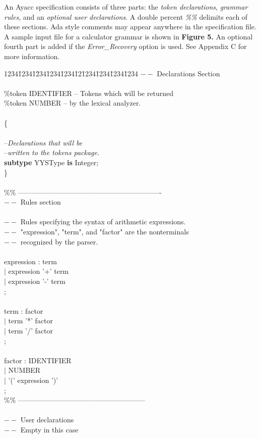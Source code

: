 An Ayacc specification  consists of three parts: the
{\it token declarations}, {\it grammar rules}, and an {\it optional user
declarations}.  A double percent
{\it \%\%}
delimits
each of these sections.  Ada style comments may appear
anywhere in the specification file.  A sample input
file for a calculator grammar is shown in {\bf Figure 5.}
An optional fourth part is added if the {\it Error\_Recovery} option
is used.  See Appendix C for more information.
\newpage
\noindent\hspace{-0.05in}\hrulefill\hspace{0.0in}\\
\vspace{-0.2in}
\begin{tabbing}
1234\=1234\=1\=234\=1234\=1234\=12\=1234\=1234\=1234\=1234 \kill
$--$ Declarations Section\\
\\
\%token IDENTIFIER         --  Tokens which will be returned\\
\%token NUMBER             --  by the lexical analyzer.\\
\\
\{\\
\\
\>  --{\it  Declarations that will be}\\
\>  --{\it  written to the tokens package.}\\
\>  {\bf subtype} YYSType {\bf is} Integer;\\
\}\\
\\
\%\% -------------------------------------------------------------\\
$--$ Rules section\\
\\
$--$ Rules specifying the syntax of arithmetic expressions.\\
$--$ "expression", "term", and "factor" are the nonterminals\\
$--$ recognized by the parser.\\
\\
expression : term\\
\>\>\>           $|$ expression '+' term\\
\>\>\>           $|$ expression '-' term\\
\>\>\>           ;\\
\\
term       : factor\\
\>\>\>           $|$ term '*' factor\\
\>\>\>           $|$ term '/' factor\\
\>\>\>           ;\\
\\
factor     : IDENTIFIER\\
\>\>\>           $|$ NUMBER\\
\>\>\>           $|$ '(' expression ')'\\
\>\>\>           ;\\
\%\% ------------------------------------------------------\\
\\
$--$ User declarations\\
$--$ Empty in this case\\
\end{tabbing}
